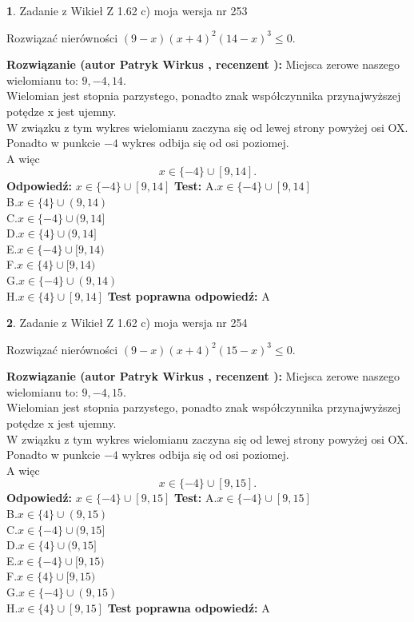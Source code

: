 \documentclass[12pt, a4paper]{article}
\theoremstyle{definition} %
\newtheorem{zad}{}
\newcommand{\zadStart}[1]{\begin{zad}#1\newline}
\newcommand{\zadStop}{\end{zad}}
\newcommand{\rozwStart}[2]{\noindent \textbf{Rozwiązanie (autor #1 , recenzent #2): }\newline}
\newcommand{\rozwStop}{\newline}
\newcommand{\odpStart}{\noindent \textbf{Odpowiedź:}\newline}
\newcommand{\odpStop}{\newline}
\newcommand{\testStart}{\noindent \textbf{Test:}\newline}
\newcommand{\testStop}{\newline}
\newcommand{\kluczStart}{\noindent \textbf{Test poprawna odpowiedź:}\newline}
\newcommand{\kluczStop}{\newline}
\begin{document}
\zadStart{Zadanie z Wikieł Z 1.62 c) moja wersja nr 253}

Rozwiązać nierówności $(9-x)(x+4)^{2}(14-x)^{3}\le0$.
\zadStop
\rozwStart{Patryk Wirkus}{}
Miejsca zerowe naszego wielomianu to: $9, -4, 14$.\\
Wielomian jest stopnia parzystego, ponadto znak współczynnika przy\linebreak najwyższej potędze x jest ujemny.\\ W związku z tym wykres wielomianu zaczyna się od lewej strony powyżej osi OX.\\
Ponadto w punkcie $-4$ wykres odbija się od osi poziomej.\\
A więc $$x \in \{-4\} \cup [9,14].$$
\rozwStop
\odpStart
$x \in \{-4\} \cup [9,14]$
\odpStop
\testStart
A.$x \in \{-4\} \cup [9,14]$\\
B.$x \in \{4\} \cup (9,14)$\\
C.$x \in \{-4\} \cup (9,14]$\\
D.$x \in \{4\} \cup (9,14]$\\
E.$x \in \{-4\} \cup [9,14)$\\
F.$x \in \{4\} \cup [9,14)$\\
G.$x \in \{-4\} \cup (9,14)$\\
H.$x \in \{4\} \cup [9,14]$
\testStop
\kluczStart
A
\kluczStop



\zadStart{Zadanie z Wikieł Z 1.62 c) moja wersja nr 254}

Rozwiązać nierówności $(9-x)(x+4)^{2}(15-x)^{3}\le0$.
\zadStop
\rozwStart{Patryk Wirkus}{}
Miejsca zerowe naszego wielomianu to: $9, -4, 15$.\\
Wielomian jest stopnia parzystego, ponadto znak współczynnika przy\linebreak najwyższej potędze x jest ujemny.\\ W związku z tym wykres wielomianu zaczyna się od lewej strony powyżej osi OX.\\
Ponadto w punkcie $-4$ wykres odbija się od osi poziomej.\\
A więc $$x \in \{-4\} \cup [9,15].$$
\rozwStop
\odpStart
$x \in \{-4\} \cup [9,15]$
\odpStop
\testStart
A.$x \in \{-4\} \cup [9,15]$\\
B.$x \in \{4\} \cup (9,15)$\\
C.$x \in \{-4\} \cup (9,15]$\\
D.$x \in \{4\} \cup (9,15]$\\
E.$x \in \{-4\} \cup [9,15)$\\
F.$x \in \{4\} \cup [9,15)$\\
G.$x \in \{-4\} \cup (9,15)$\\
H.$x \in \{4\} \cup [9,15]$
\testStop
\kluczStart
A
\kluczStop
\end{document}
